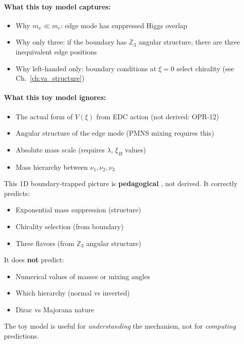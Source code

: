 \paragraph{What this toy model captures:}
\begin{itemize}[nosep]
    \item[\ding{51}] Why $m_\nu \ll m_e$: edge mode has suppressed Higgs overlap
    \item[\ding{51}] Why only three: if the boundary has $\mathbb{Z}_3$ angular structure,
          there are three inequivalent edge positions
    \item[\ding{51}] Why left-handed only: boundary conditions at $\xi = 0$ select chirality
          (see Ch.~\ref{ch:va_structure})
\end{itemize}

\paragraph{What this toy model ignores:}
\begin{itemize}[nosep]
    \item[$\times$] The actual form of $V(\xi)$ from EDC action (not derived: OPR-12)
    \item[$\times$] Angular structure of the edge mode (PMNS mixing requires this)
    \item[$\times$] Absolute mass scale (requires $\lambda$, $\xi_H$ values)
    \item[$\times$] Mass hierarchy between $\nu_1, \nu_2, \nu_3$
\end{itemize}

\begin{tcolorbox}[colback=yellow!5!white, colframe=yellow!60!black,
    title=\textbf{Toy Model Status}]
This 1D boundary-trapped picture is \textbf{pedagogical} \tagP{}, not derived.
It correctly predicts:
\begin{itemize}[nosep]
    \item Exponential mass suppression (structure)
    \item Chirality selection (from boundary)
    \item Three flavors (from $\mathbb{Z}_3$ angular structure)
\end{itemize}
It does \textbf{not} predict:
\begin{itemize}[nosep]
    \item Numerical values of masses or mixing angles
    \item Which hierarchy (normal vs inverted)
    \item Dirac vs Majorana nature
\end{itemize}
The toy model is useful for \emph{understanding} the mechanism, not for
\emph{computing} predictions.
\end{tcolorbox}

